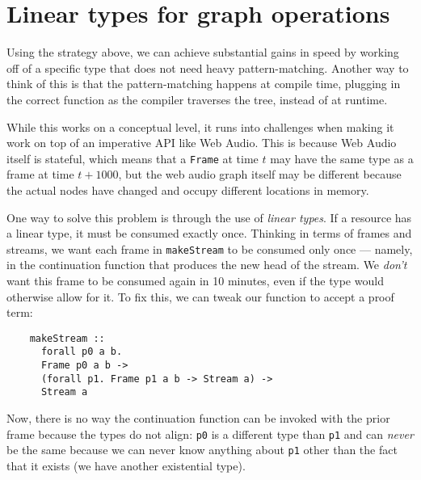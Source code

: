 \documentclass{sig-alternate}
\begin{document}
\begin{sloppypar}
  \section{Linear types for graph operations}

  Using the strategy above, we can achieve substantial gains in speed by working off of a specific type that does not need heavy pattern-matching.  Another way to think of this is that the pattern-matching happens at compile time, plugging in the correct function as the compiler traverses the tree, instead of at runtime.

  While this works on a conceptual level, it runs into challenges when making it work on top of an imperative API like Web Audio. This is because Web Audio itself is stateful, which means that a \texttt{Frame} at time $t$ may have the same type as a frame at time $t + 1000$, but the web audio graph itself may be different because the actual nodes have changed and occupy different locations in memory.

  One way to solve this problem is through the use of \textit{linear types}. If a resource has a linear type, it must be consumed exactly once.  Thinking in terms of frames and streams, we want each frame in \texttt{makeStream} to be consumed only once --- namely, in the continuation function that produces the new head of the stream. We \textit{don't} want this frame to be consumed again in 10 minutes, even if the type would otherwise allow for it. To fix this, we can tweak our function to accept a proof term:

  \begin{verbatim}
    makeStream ::
      forall p0 a b.
      Frame p0 a b ->
      (forall p1. Frame p1 a b -> Stream a) ->
      Stream a
      \end{verbatim}
  
  Now, there is no way the continuation function can be invoked with the prior frame because the types do not align: \texttt{p0} is a different type than \texttt{p1} and can \textit{never} be the same because we can never know anything about \texttt{p1} other than the fact that it exists (we have another existential type).


\end{sloppypar}
\end{document}
